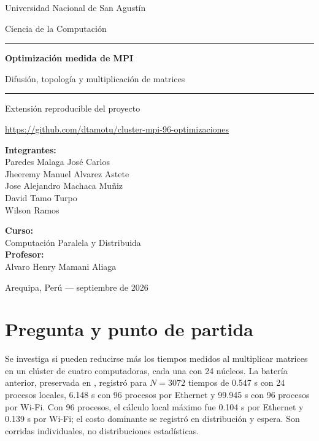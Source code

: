 \documentclass[11pt,a4paper]{article}
\begin{document}
\begin{titlepage}
\centering
{\Large Universidad Nacional de San Agustín\par}
\vspace{0.4cm}
{\large Ciencia de la Computación\par}
\vspace{2cm}
\rule{\linewidth}{0.5mm}\par
\vspace{0.4cm}
{\Huge\bfseries Optimización medida de MPI\par}
\vspace{0.3cm}
{\Large Difusión, topología y multiplicación de matrices\par}
\vspace{0.4cm}
\rule{\linewidth}{0.5mm}\par
\vspace{2cm}
{\large Extensión reproducible del proyecto\par}
\vspace{0.3cm}
\url{https://github.com/dtamotu/cluster-mpi-96-optimizaciones}\par
\vspace{2cm}
\begin{minipage}[t]{0.52\linewidth}\raggedright
\textbf{Integrantes:}\\
Paredes Malaga José Carlos\\
Jheeremy Manuel Alvarez Astete\\
Jose Alejandro Machaca Muñiz\\
David Tamo Turpo\\
Wilson Ramos
\end{minipage}\hfill
\begin{minipage}[t]{0.4\linewidth}\raggedleft
\textbf{Curso:}\\
Computación Paralela y Distribuida\\[0.2cm]
\textbf{Profesor:}\\
Alvaro Henry Mamani Aliaga
\end{minipage}
\vfill
{\large Arequipa, Perú --- septiembre de 2026\par}
\end{titlepage}

\tableofcontents
\clearpage
\section{Pregunta y punto de partida}
Se investiga si pueden reducirse más los tiempos medidos al multiplicar matrices en un clúster de cuatro computadoras, cada una con 24 núcleos. La batería anterior, preservada en , registró para $N=3072$ tiempos de 0.547 s con 24 procesos locales, 6.148 s con 96 procesos por Ethernet y 99.945 s con 96 procesos por Wi-Fi. Con 96 procesos, el cálculo local máximo fue 0.104 s por Ethernet y 0.139 s por Wi-Fi; el costo dominante se registró en distribución y espera. Son corridas individuales, no distribuciones estadísticas.
\end{document}
